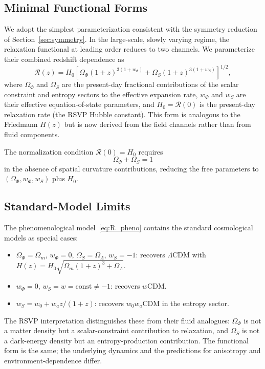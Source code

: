 \documentclass[12pt,a4paper]{article}
\theoremstyle{remark}
\newcommand{\Rcal}{\mathcal{R}}
\begin{document}
\subsection{Minimal Functional Forms}

We adopt the simplest parameterization consistent with the symmetry reduction
of Section~\ref{sec:symmetry}. In the large-scale, slowly varying regime, the
relaxation functional at leading order reduces to two channels. We parameterize
their combined redshift dependence as
\begin{equation}
\Rcal(z) = H_0\left[
  \Omega_\Phi (1+z)^{3(1+w_\Phi)}
  + \Omega_S (1+z)^{3(1+w_S)}
\right]^{1/2},
\label{eq:R_pheno}
\end{equation}
where $\Omega_\Phi$ and $\Omega_S$ are the present-day fractional contributions
of the scalar constraint and entropy sectors to the effective expansion rate,
$w_\Phi$ and $w_S$ are their effective equation-of-state parameters, and
$H_0 = \Rcal(0)$ is the present-day relaxation rate (the RSVP Hubble constant).
This form is analogous to the Friedmann $H(z)$ but is now derived from the
field channels rather than from fluid components.

The normalization condition $\Rcal(0) = H_0$ requires
\begin{equation}
\Omega_\Phi + \Omega_S = 1
\end{equation}
in the absence of spatial curvature contributions, reducing the free parameters
to $(\Omega_\Phi, w_\Phi, w_S)$ plus $H_0$.

\subsection{Standard-Model Limits}

The phenomenological model~\eqref{eq:R_pheno} contains the standard cosmological
models as special cases:
\begin{itemize}[leftmargin=2em]
\item $\Omega_\Phi = \Omega_m$, $w_\Phi = 0$, $\Omega_S = \Omega_\Lambda$,
  $w_S = -1$: recovers $\Lambda$CDM with $H(z) = H_0\sqrt{\Omega_m(1+z)^3 + \Omega_\Lambda}$.
\item $w_\Phi = 0$, $w_S = w = \mathrm{const} \ne -1$: recovers $w$CDM.
\item $w_S = w_0 + w_a z/(1+z)$: recovers $w_0 w_a$CDM in the entropy sector.
\end{itemize}
The RSVP interpretation distinguishes these from their fluid analogues: $\Omega_\Phi$
is not a matter density but a scalar-constraint contribution to relaxation, and
$\Omega_S$ is not a dark-energy density but an entropy-production contribution.
The functional form is the same; the underlying dynamics and the predictions
for anisotropy and environment-dependence differ.
\end{document}

